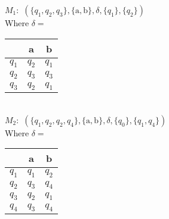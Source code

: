 $M_1:$ $(\{q_1, q_2, q_3\}, \{\text{a},\text{b}\}, \delta, \{q_1\}, \{q_2\})$ \\ 
	\indent Where $\delta=$ \begin{tabular}{c|cc}
				&	a		&	b		\\ \hline
		$q_1$	&	$q_2$	&	$q_1$	\\
		$q_2$	&	$q_3$	&	$q_3$	\\
		$q_3$	&	$q_2$	&	$q_1$	\\
	\end{tabular} \\[15pt]
$M_2:$ $(\{q_1, q_2, q_2, q_4\}, \{\text{a}, \text{b}\}, \delta, \{q_0\}, \{q_1, q_4\})$ \\ 
	\indent Where $\delta=$ \begin{tabular}{c|cc}
				&	a		&	b		\\ \hline
		$q_1$	&	$q_1$	&	$q_2$	\\
		$q_2$	&	$q_3$	&	$q_4$	\\
		$q_3$	&	$q_2$	&	$q_1$	\\
		$q_4$	&	$q_3$	&	$q_4$	\\
	\end{tabular} \\